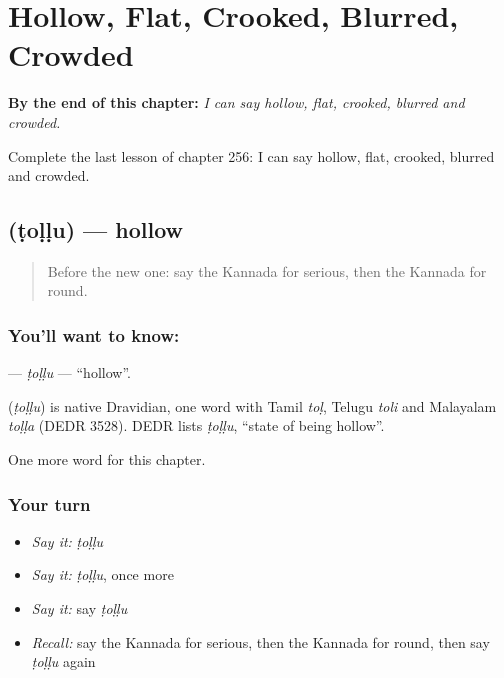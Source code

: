 
\chapter{Hollow, Flat, Crooked, Blurred, Crowded}
\label{ch:ka-hollow-flat-crooked-blurred-crowded}

\begin{chapteropening}
\textbf{By the end of this chapter:} \emph{I can say hollow, flat, crooked, blurred and crowded.}

Complete the last lesson of chapter 256: I can say hollow, flat, crooked, blurred and crowded.
\end{chapteropening}

\section[\texorpdfstring{\kn{ಟೊಳ್ಳು} (ṭoḷḷu)}{ಟೊಳ್ಳು (ṭoḷḷu)}]{ (ṭoḷḷu) — hollow}

\label{lesson:KA-C256-tollu}



\begin{quote}
Before the new one: say the Kannada for serious, then the Kannada for round.
\end{quote}

\subsection*{You'll want to know: }
\textbf{} — \emph{ṭoḷḷu} — \textquotedblleft{}hollow\textquotedblright{}.

\begin{cousinweb}
\textbf{} (\emph{ṭoḷḷu}) is native Dravidian, one word with Tamil \emph{toḷ}, Telugu \emph{toli} and Malayalam \emph{toḷḷa} (DEDR 3528). DEDR lists \emph{ṭoḷḷu}, \textquotedblleft{}state of being hollow\textquotedblright{}.
\end{cousinweb}

\begin{grammarlens}[title={What you've built}]
One more word for this chapter.
\end{grammarlens}

\subsection*{Your turn}
\begin{itemize}
\raggedright
  \item \emph{Say it:} \emph{ṭoḷḷu}
  \item \emph{Say it:} \emph{ṭoḷḷu}, once more
  \item \emph{Say it:} say \emph{ṭoḷḷu}
  \item \emph{Recall:} say the Kannada for serious, then the Kannada for round, then say \emph{ṭoḷḷu} again
\end{itemize}

